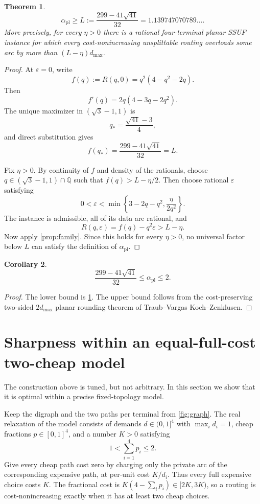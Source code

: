 \documentclass[11pt]{article}
\newtheorem{theorem}{Theorem}
\newtheorem{corollary}[theorem]{Corollary}
\theoremstyle{remark}
\newcommand{\Q}{\mathbb{Q}}
\newcommand{\apl}{\alpha_{\mathrm{pl}}}
\begin{document}
\begin{theorem}\label{thm:main}
\[
 \apl\ge L:=\frac{299-41\sqrt{41}}{32}
 =1.139747070789\ldots .
\]
More precisely, for every $\eta>0$ there is a rational four-terminal planar
SSUF instance for which every cost-nonincreasing unsplittable routing
overloads some arc by more than $(L-\eta)d_{\max}$.
\end{theorem}
\begin{proof}
At $\varepsilon=0$, write
\[
 f(q):=R(q,0)=q^2(4-q^2-2q).
\]
Then
\[
 f'(q)=2q(4-3q-2q^2).
\]
The unique maximizer in $(\sqrt3-1,1)$ is
\[
 q_*=\frac{\sqrt{41}-3}{4},
\]
and direct substitution gives
\[
 f(q_*)=\frac{299-41\sqrt{41}}{32}=L.
\]

Fix $\eta>0$.  By continuity of $f$ and density of the rationals, choose
$q\in(\sqrt3-1,1)\cap\Q$ such that
$f(q)>L-\eta/2$.  Then choose rational $\varepsilon$ satisfying
\[
 0<\varepsilon<\min\left\{3-2q-q^2,\frac{\eta}{2q^2}\right\}.
\]
The instance is admissible, all of its data are rational, and
\[
 R(q,\varepsilon)=f(q)-q^2\varepsilon>L-\eta.
\]
Now apply \cref{prop:family}.  Since this holds for every $\eta>0$, no
universal factor below $L$ can satisfy the definition of $\apl$.
\end{proof}

\begin{corollary}
\[
 \frac{299-41\sqrt{41}}{32}\le\apl\le2.
\]
\end{corollary}
\begin{proof}
The lower bound is \cref{thm:main}.  The upper bound follows from the
cost-preserving two-sided $2d_{\max}$ planar rounding theorem of
Traub--Vargas Koch--Zenklusen.
\end{proof}

\section{Sharpness within an equal-full-cost two-cheap model}

The construction above is tuned, but not arbitrary.  In this section we
show that it is optimal within a precise fixed-topology model.

Keep the digraph and the two paths per terminal from \cref{fig:graph}.
The real relaxation of the model consists of demands
$d\in(0,1]^4$ with $\max_i d_i=1$, cheap fractions $p\in[0,1]^4$, and a
number $K>0$ satisfying
\[
 1<\sum_{i=1}^4 p_i\le2.
\]
Give every cheap path cost zero by charging only the private arc of the
corresponding expensive path, at per-unit cost $K/d_i$.  Thus every full
expensive choice costs $K$.  The fractional cost is
$K(4-\sum_i p_i)\in[2K,3K)$, so a routing is cost-nonincreasing exactly when
it has at least two cheap choices.
\end{document}

